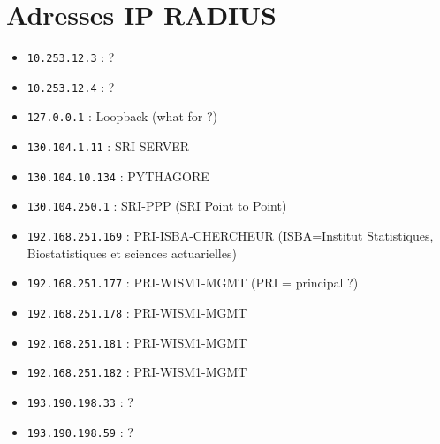 \documentclass[10pt,a4paper]{article}
\begin{document}
\section{Adresses IP RADIUS}
\begin{itemize}
\item \texttt{10.253.12.3} : ?
\item \texttt{10.253.12.4} : ?
\item \texttt{127.0.0.1} : Loopback (what for ?)
\item \texttt{130.104.1.11} : SRI SERVER
\item \texttt{130.104.10.134} : PYTHAGORE
\item \texttt{130.104.250.1} : SRI-PPP (SRI Point to Point)
\item \texttt{192.168.251.169} : PRI-ISBA-CHERCHEUR (ISBA=Institut Statistiques, Biostatistiques et sciences actuarielles)
\item \texttt{192.168.251.177} : PRI-WISM1-MGMT (PRI = principal ?)
\item \texttt{192.168.251.178} : PRI-WISM1-MGMT
\item \texttt{192.168.251.181} : PRI-WISM1-MGMT
\item \texttt{192.168.251.182} : PRI-WISM1-MGMT
\item \texttt{193.190.198.33} : ?
\item \texttt{193.190.198.59} : ?
\end{itemize}
\end{document}
